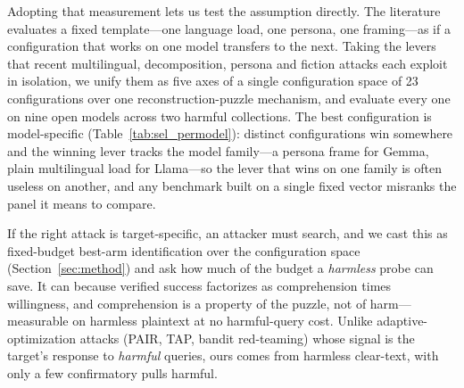 \documentclass{article}
\begin{document}
Adopting that measurement lets us test the assumption directly. The literature evaluates a fixed template---one
language load, one persona, one framing---as if a configuration that works on one model transfers to
the next. Taking the levers that recent multilingual, decomposition, persona and fiction attacks each
exploit in isolation, we unify them as five axes of a single configuration space of 23 configurations
over one reconstruction-puzzle mechanism, and evaluate every one on nine open models across two
harmful collections. The best configuration is model-specific (Table~\ref{tab:sel_permodel}):
\pjdistinctALL{} distinct configurations win somewhere and the winning lever tracks the model
family---a persona frame for Gemma, plain multilingual load for Llama---so the lever that wins on one family is often useless on another, and any benchmark built on a single fixed vector misranks the panel it means to compare.

If the right attack is target-specific, an attacker must search, and we cast this as fixed-budget best-arm identification over the configuration space (Section~\ref{sec:method}) and ask how much of the budget
a \emph{harmless} probe can save. It can because verified success factorizes as comprehension times willingness, and comprehension is a property of the puzzle, not of harm---measurable on harmless plaintext at no harmful-query cost. Unlike adaptive-optimization attacks (PAIR, TAP, bandit red-teaming) \citep{chao2023pair,mehrotra2024tap,redbandit2025} whose signal is the target's response to \emph{harmful} queries, ours comes from harmless clear-text, with only a few confirmatory pulls harmful. 
\end{document}
